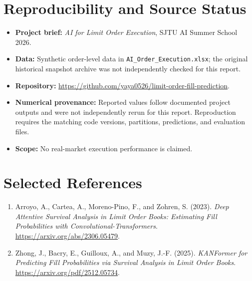 \documentclass[11pt,a4paper]{article}
\begin{document}
\section*{Reproducibility and Source Status}
\begin{itemize}[leftmargin=*]
\item \textbf{Project brief:} \emph{AI for Limit Order Execution}, SJTU AI Summer School 2026.
\item \textbf{Data:} Synthetic order-level data in \texttt{AI\_Order\_Execution.xlsx}; the original historical snapshot archive was not independently checked for this report.
\item \textbf{Repository:} \url{https://github.com/yaya0526/limit-order-fill-prediction}.
\item \textbf{Numerical provenance:} Reported values follow documented project outputs and were not independently rerun for this report. Reproduction requires the matching code versions, partitions, predictions, and evaluation files.
\item \textbf{Scope:} No real-market execution performance is claimed.
\end{itemize}

\section*{Selected References}
\begin{enumerate}[leftmargin=*]\item Arroyo, A., Cartea, A., Moreno-Pino, F., and Zohren, S. (2023). \emph{Deep Attentive Survival Analysis in Limit Order Books: Estimating Fill Probabilities with Convolutional-Transformers}. \url{https://arxiv.org/abs/2306.05479}.\item Zhong, J., Bacry, E., Guilloux, A., and Muzy, J.-F. (2025). \emph{KANFormer for Predicting Fill Probabilities via Survival Analysis in Limit Order Books}. \url{https://arxiv.org/pdf/2512.05734}.\end{enumerate}
\end{document}
